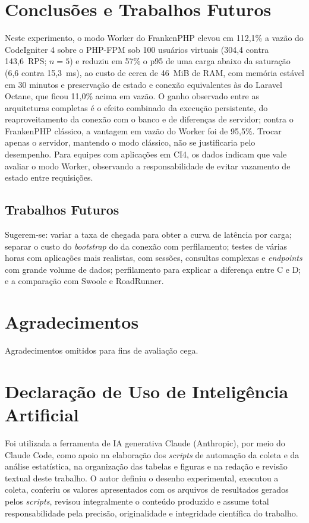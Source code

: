 \documentclass[sigconf, nonacm, screen, anonymous, language=portuguese, language=spanish, language={main=english}]{acmart}
\begin{document}
\section{Conclusões e Trabalhos Futuros}
Neste experimento, o modo Worker do FrankenPHP elevou em 112,1\% a vazão do CodeIgniter 4 sobre o PHP-FPM sob 100 usuários virtuais (304,4 contra 143,6~RPS; $n=5$) e reduziu em 57\% o p95 de uma carga abaixo da saturação (6,6 contra 15,3~ms), ao custo de cerca de 46~MiB de RAM, com memória estável em 30 minutos e preservação de estado e conexão equivalentes às do Laravel Octane, que ficou 11,0\% acima em vazão. O ganho observado entre as arquiteturas completas é o efeito combinado da execução persistente, do reaproveitamento da conexão com o banco e de diferenças de servidor; contra o FrankenPHP clássico, a vantagem em vazão do Worker foi de 95,5\%. Trocar apenas o servidor, mantendo o modo clássico, não se justificaria pelo desempenho. Para equipes com aplicações em CI4, os dados indicam que vale avaliar o modo Worker, observando a responsabilidade de evitar vazamento de estado entre requisições.

\subsection{Trabalhos Futuros}
Sugerem-se: variar a taxa de chegada para obter a curva de latência por carga; separar o custo do \textit{bootstrap} do da conexão com perfilamento; testes de várias horas com aplicações mais realistas, com sessões, consultas complexas e \textit{endpoints} com grande volume de dados; perfilamento para explicar a diferença entre C e D; e a comparação com Swoole e RoadRunner.

\section*{Agradecimentos}
Agradecimentos omitidos para fins de avaliação cega.

\section*{Declaração de Uso de Inteligência Artificial}
Foi utilizada a ferramenta de IA generativa Claude (Anthropic), por meio do Claude Code, como apoio na elaboração dos \textit{scripts} de automação da coleta e da análise estatística, na organização das tabelas e figuras e na redação e revisão textual deste trabalho. O autor definiu o desenho experimental, executou a coleta, conferiu os valores apresentados com os arquivos de resultados gerados pelos \textit{scripts}, revisou integralmente o conteúdo produzido e assume total responsabilidade pela precisão, originalidade e integridade científica do trabalho.
\end{document}
